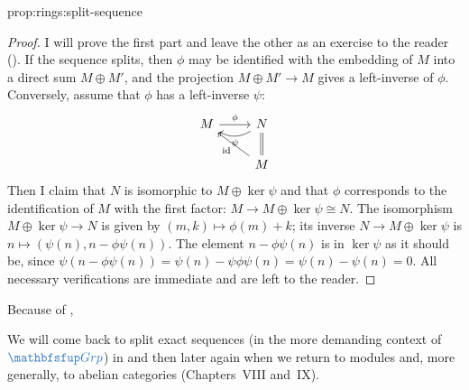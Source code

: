 \begin{prop}{}{prop:rings:split-sequence}
\end{prop}
\begin{proof}
  I will prove the first part and leave the other as an exercise to
  the reader
  (). If the
  sequence splits, then $\phi$ may be identified with the embedding of
  $M$ into a direct sum $M \oplus M'$, and the projection
  $M \oplus M' \to M$ gives a left-inverse of $\phi$. Conversely,
  assume that $\phi$ has a left-inverse $\psi$:
  \[\begin{tikzcd}
      M \arrow[r, "\phi"] & N \arrow[l, bend left, "\psi"] \\
      & M \arrow[u, equal] \arrow[ul, "\id"]
    \end{tikzcd}\] Then I claim that $N$ is isomorphic to
  $M \oplus \ker\psi$ and that $\phi$ corresponds to the
  identification of $M$ with the first factor:
  $M \to M \oplus \ker\psi \cong N$. The isomorphism
  $M \oplus \ker\psi \to N$ is given by $(m, k) \mapsto \phi(m) + k$;
  its inverse $N \to M \oplus \ker\psi$ is
  $n \mapsto (\psi(n), n - \phi\psi(n))$. The element
  $n - \phi\psi(n)$ is in $\ker\psi$ as it should be, since
  $\psi(n - \phi\psi(n)) = \psi(n) - \psi\phi\psi(n) = \psi(n) -
  \psi(n) = 0$. All necessary verifications are immediate and are left
  to the reader.
\end{proof}

Because of ,

We will come back to split exact sequences (in the more demanding
context of $\categ{Grp}$) in
and then later again when we return to modules and, more generally, to
abelian categories (Chapters~VIII and~IX).

